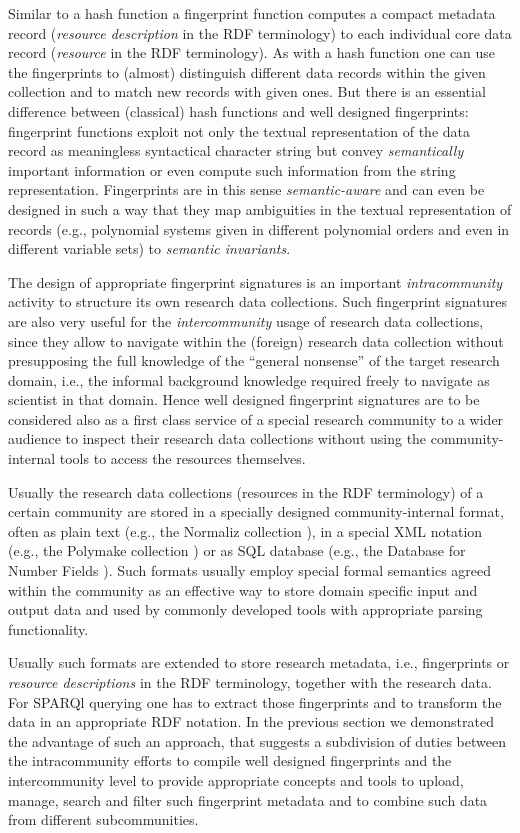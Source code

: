 \documentclass{mathincs}
\begin{document}
Similar to a hash function a fingerprint function computes a compact metadata
record (\emph{resource description} in the RDF terminology) to each individual
core data record (\emph{resource} in the RDF terminology).  As with a hash
function one can use the fingerprints to (almost) distinguish different data
records within the given collection and to match new records with given
ones. But there is an essential difference between (classical) hash functions
and well designed fingerprints: fingerprint functions exploit not only the
textual representation of the data record as meaningless syntactical character
string but convey \emph{semantically} important information or even compute
such information from the string representation.  Fingerprints are in this
sense \emph{semantic-aware} and can even be designed in such a way that they
map ambiguities in the textual representation of records (e.g., polynomial
systems given in different polynomial orders and even in different variable
sets) to \emph{semantic invariants}.

The design of appropriate fingerprint signatures is an important
\emph{intracommunity} activity to structure its own research data collections.
Such fingerprint signatures are also very useful for the \emph{intercommunity}
usage of research data collections, since they allow to navigate within the
(foreign) research data collection without presupposing the full knowledge of
the ``general nonsense'' of the target research domain, i.e., the informal
background knowledge required freely to navigate as scientist in that domain.
Hence well designed fingerprint signatures are to be considered also as a first
class service of a special research community to a wider audience to inspect
their research data collections without using the community-internal tools to
access the resources themselves.

Usually the research data collections (resources in the RDF terminology) of a
certain community are stored in a specially designed community-internal format,
often as plain text (e.g., the Normaliz collection \cite{normaliz}), in a
special XML notation (e.g., the Polymake collection \cite{polymake}) or as SQL
database (e.g., the Database for Number Fields \cite{MalleKlueners}).  Such
formats usually employ special formal semantics agreed within the community as
an effective way to store domain specific input and output data and used by
commonly developed tools with appropriate parsing functionality.

Usually such formats are extended to store research metadata, i.e.,
fingerprints or \emph{resource descriptions} in the RDF terminology, together
with the research data.  For SPARQl querying one has to extract those
fingerprints and to transform the data in an appropriate RDF notation. In the
previous section we demonstrated the advantage of such an approach, that
suggests a subdivision of duties between the intracommunity efforts to compile
well designed fingerprints and the intercommunity level to provide appropriate
concepts and tools to upload, manage, search and filter such fingerprint
metadata and to combine such data from different subcommunities.
\end{document}
